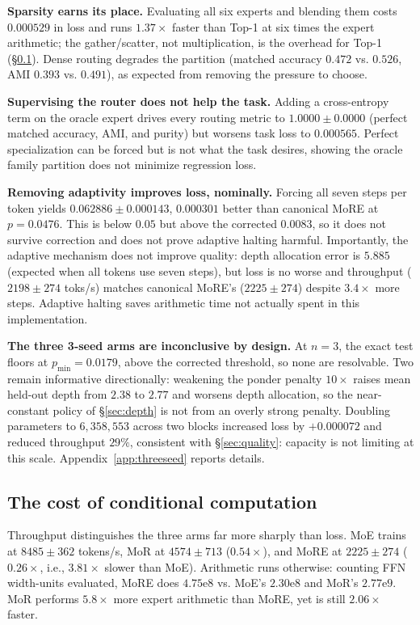 \documentclass{article}
\begin{document}
\textbf{Sparsity earns its place.} Evaluating all six experts and blending them costs $0.000529$ in loss and runs $1.37\times$ faster than Top-1 at six times the expert arithmetic; the gather/scatter, not multiplication, is the overhead for Top-1 (\S\ref{sec:cost}). Dense routing degrades the partition (matched accuracy $0.472$ vs. $0.526$, AMI $0.393$ vs. $0.491$), as expected from removing the pressure to choose.

\textbf{Supervising the router does not help the task.} Adding a cross-entropy term on the oracle expert drives every routing metric to $1.0000 \pm 0.0000$ (perfect matched accuracy, AMI, and purity) but worsens task loss to $0.000565$. Perfect specialization can be forced but is not what the task desires, showing the oracle family partition does not minimize regression loss.

\textbf{Removing adaptivity improves loss, nominally.} Forcing all seven steps per token yields $0.062886 \pm 0.000143$, $0.000301$ better than canonical MoRE at $p=0.0476$. This is below $0.05$ but above the corrected $0.0083$, so it does not survive correction and does not prove adaptive halting harmful. Importantly, the adaptive mechanism does not improve quality: depth allocation error is $5.885$ (expected when all tokens use seven steps), but loss is no worse and throughput ($2198 \pm 274$ toks/s) matches canonical MoRE’s ($2225 \pm 274$) despite $3.4\times$ more steps. Adaptive halting saves arithmetic time not actually spent in this implementation.

\textbf{The three 3-seed arms are inconclusive by design.} At $n=3$, the exact test floors at $p_{\min} = 0.0179$, above the corrected threshold, so none are resolvable. Two remain informative directionally: weakening the ponder penalty $10\times$ raises mean held-out depth from $2.38$ to $2.77$ and worsens depth allocation, so the near-constant policy of \S\ref{sec:depth} is not from an overly strong penalty. Doubling parameters to $6{,}358{,}553$ across two blocks increased loss by $+0.000072$ and reduced throughput $29\%$, consistent with \S\ref{sec:quality}: capacity is not limiting at this scale. Appendix~\ref{app:threeseed} reports details.

\subsection{The cost of conditional computation}
\label{sec:cost}

Throughput distinguishes the three arms far more sharply than loss. MoE trains at $8485 \pm 362$ tokens/s, MoR at $4574 \pm 713$ ($0.54\times$), and MoRE at $2225 \pm 274$ ($0.26\times$, i.e., $3.81\times$ slower than MoE). Arithmetic runs otherwise: counting FFN width-units evaluated, MoRE does $4.75\mathrm{e}8$ vs. MoE's $2.30\mathrm{e}8$ and MoR's $2.77\mathrm{e}9$. MoR performs $5.8\times$ more expert arithmetic than MoRE, yet is still $2.06\times$ faster.
\end{document}
